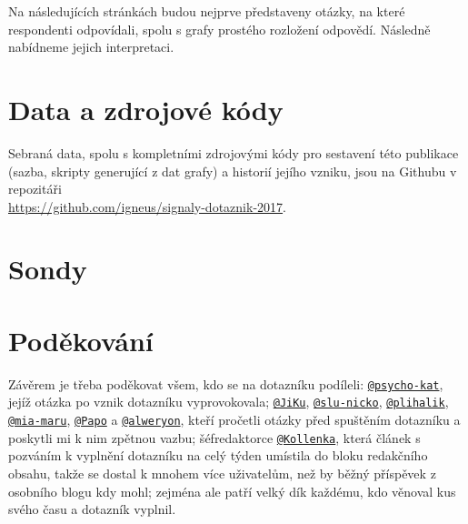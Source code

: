 \documentclass[12pt, a4paper, twoside]{article}
\makeatletter
\newcommand{\suser}[1]{\href{https://www.signaly.cz/#1}{\texttt{@#1}}}
\makeatother
\begin{document}
Na následujících stránkách budou nejprve představeny otázky,
na které respondenti odpovídali, spolu s grafy prostého
rozložení odpovědí. Následně nabídneme jejich interpretaci.

\section{Data a zdrojové kódy}

Sebraná data, spolu s kompletními zdrojovými kódy pro sestavení
této publikace (sazba, skripty generující z dat grafy)
a historií jejího vzniku,
jsou na Githubu v repozitáři\\
\url{https://github.com/igneus/signaly-dotaznik-2017}.









\section{Sondy}

\section*{Poděkování}

Závěrem je třeba poděkovat všem, kdo se na dotazníku podíleli:
\suser{psycho-kat}, jejíž otázka po 
vznik dotazníku vyprovokovala;
\suser{JiKu}, \suser{slu-nicko}, \suser{plihalik}, \suser{mia-maru},
\suser{Papo} a \suser{alweryon}, kteří pročetli otázky před spuštěním
dotazníku a poskytli mi k nim zpětnou vazbu;
šéfredaktorce \suser{Kollenka}, která článek s pozváním k vyplnění
dotazníku na celý týden umístila do bloku redakčního obsahu,
takže se dostal
k mnohem více uživatelům, než by běžný příspěvek z osobního blogu
kdy mohl;
zejména ale patří velký dík každému, kdo věnoval kus svého času
a dotazník vyplnil.

\tableofcontents
\end{document}
